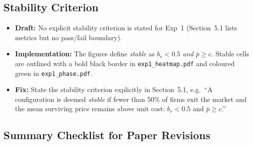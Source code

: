 \documentclass{article}
\begin{document}
\subsection{Stability Criterion}

\begin{itemize}
  \item \textbf{Draft:} No explicit stability criterion is stated for Exp~1
        (Section~5.1 lists metrics but no pass/fail boundary).
  \item \textbf{Implementation:} The figures define \emph{stable} as
        $b_r < 0.5$ \emph{and} $\bar{p} \geq c$.  Stable cells are outlined with
        a bold black border in \texttt{exp1\_heatmap.pdf} and coloured green in
        \texttt{exp1\_phase.pdf}.
  \item \textbf{Fix:} State the stability criterion explicitly in Section~5.1,
        e.g.\ ``A configuration is deemed \emph{stable} if fewer than 50\% of
        firms exit the market and the mean surviving price remains above unit cost:
        $b_r < 0.5$ and $\bar{p} \geq c$.''
\end{itemize}

\subsection{Summary Checklist for Paper Revisions}
\end{document}
